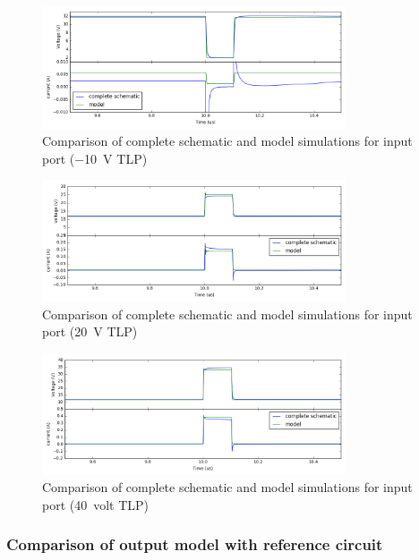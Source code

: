 \begin{figure}[!p]
  \centering
  \includegraphics[width=0.8\textwidth]{src/4/figures/comparison_model_total_m10V.png}
  \caption{Comparison of complete schematic and model simulations for input port (\SI{-10}{\volt} TLP)}
  \label{fig:compare-model-simu-m10}
\end{figure}

\begin{figure}[!p]
  \centering
  \includegraphics[width=0.8\textwidth]{src/4/figures/comparison_model_total_20V.png}
  \caption{Comparison of complete schematic and model simulations for input port (\SI{20}{\volt} TLP)}
  \label{fig:compare-model-simu-20}
\end{figure}

\begin{figure}[!p]
  \centering
  \includegraphics[width=0.8\textwidth]{src/4/figures/comparison_model_total_40V.png}
  \caption{Comparison of complete schematic and model simulations for input port (\SI{40}{volt} TLP)}
  \label{fig:compare-model-simu-40}
\end{figure}

\subsubsection{Comparison of output model with reference circuit}

